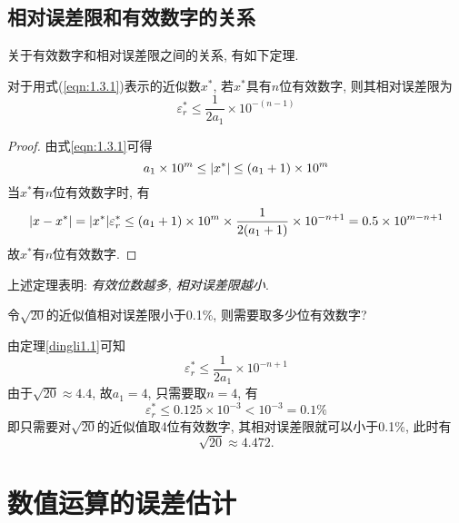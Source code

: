 \subsection{相对误差限和有效数字的关系} %

关于有效数字和相对误差限之间的关系, 有如下定理.
\begin{theorem}\label{dingli1.1}
    对于用式(\ref{eqn:1.3.1})表示的近似数$x^*$, 若$x^*$具有$n$位有效数字, 则其相对误差限为
    \begin{equation*}
        \varepsilon_r^*\le\frac{1}{2a_1}\times10^{-(n-1)}
    \end{equation*}
\end{theorem}

\begin{proof}
    由式\ref{eqn:1.3.1}可得
    \begin{equation*}
        a_1\times10^m\le\abs{x^*}\le(a_1+1)\times10^m
    \end{equation*}
    当$x^*$有$n$位有效数字时, 有
    \begin{equation*}
        \abs{x-x^*}=\abs{x^*}\varepsilon_r^*\le(a_1+1)\times10^m\times\frac{1}{2(a_1+1)}\times10^{-n+1}=0.5\times10^{m-n+1}
    \end{equation*}
    故$x^*$有$n$位有效数字.
\end{proof}

上述定理表明: \emph{有效位数越多, 相对误差限越小}.

\begin{example}
    令$\sqrt{20}$的近似值相对误差限小于0.1\%, 则需要取多少位有效数字?
\end{example}
\begin{solution}
    由定理\ref{dingli1.1}可知
    \begin{equation*}
        \varepsilon_r^*\le\frac{1}{2a_1}\times10^{-n+1}
    \end{equation*}
    由于$\sqrt{20}\approx4.4$, 故$a_1=4$, 只需要取$n=4$, 有
    \begin{equation*}
        \varepsilon_r^*\le0.125\times10^{-3}<10^{-3}=0.1\%
    \end{equation*}
    即只需要对$\sqrt{20}$的近似值取4位有效数字, 其相对误差限就可以小于0.1\%, 此时有
    \begin{equation*}
        \sqrt{20}\approx4.472.
    \end{equation*}
\end{solution}

\section{数值运算的误差估计}

